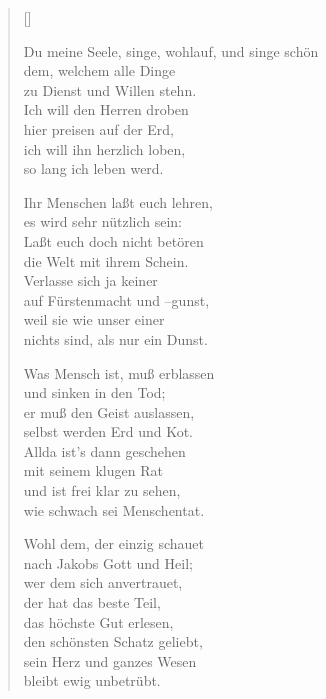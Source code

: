 \begin{multicols}{2}
\settowidth{\versewidth}{Ihr Menschen laßt euch lehren,}
\begin{verse}[\versewidth]


 Du meine Seele, singe,
wohlauf, und singe schön\\
dem, welchem alle Dinge\\
zu Dienst und Willen stehn.\\
Ich will den Herren droben\\
hier preisen auf der Erd,\\
ich will ihn herzlich loben,\\
so lang ich leben werd.

 Ihr Menschen laßt euch lehren,\\
es wird sehr nützlich sein:\\
Laßt euch doch nicht betören\\
die Welt mit ihrem Schein.\\
Verlasse sich ja keiner\\
auf Fürstenmacht und –gunst,\\
weil sie wie unser einer\\
nichts sind, als nur ein Dunst.

 Was Mensch ist, muß erblassen\\
und sinken in den Tod;\\
er muß den Geist auslassen,\\
selbst werden Erd und Kot.\\
Allda ist's dann geschehen\\
mit seinem klugen Rat\\
und ist frei klar zu sehen,\\
wie schwach sei Menschentat.

 Wohl dem, der einzig schauet\\
nach Jakobs Gott und Heil;\\
wer dem sich anvertrauet,\\
der hat das beste Teil,\\
das höchste Gut erlesen,\\
den schönsten Schatz geliebt,\\
sein Herz und ganzes Wesen\\
bleibt ewig unbetrübt.


\end{verse}
\end{multicols}
